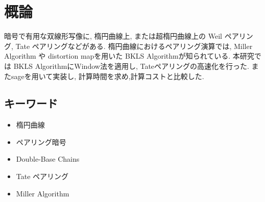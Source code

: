 \chapter*{概論}
暗号で有用な双線形写像に, 楕円曲線上, または超楕円曲線上の Weil ペアリング, Tate ペアリングなどがある. 楕円曲線におけるペアリング演算では, Miller Algorithm や distortion mapを用いた BKLS Algorithmが知られている. 本研究では BKLS AlgorithmにWindow法を適用し, Tateペアリングの高速化を行った. またsageを用いて実装し, 計算時間を求め,計算コストと比較した.

\bigskip

\section*{キーワード}
\begin{itemize}
\item 楕円曲線
\item ペアリング暗号
\item Double-Base Chains
\item Tate  ペアリング
\item Miller Algorithm
\end{itemize}
